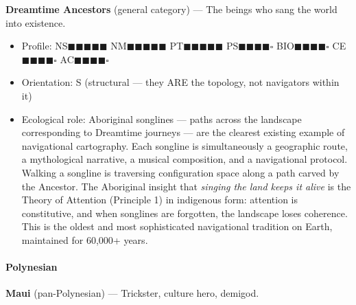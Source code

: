 \textbf{Dreamtime Ancestors} (general category) — The beings who sang the world into existence.

\begin{itemize}[nosep,leftmargin=*]
  \item Profile: NS$\blacksquare$$\blacksquare$$\blacksquare$$\blacksquare$$\blacksquare$ NM$\blacksquare$$\blacksquare$$\blacksquare$$\blacksquare$$\blacksquare$ PT$\blacksquare$$\blacksquare$$\blacksquare$$\blacksquare$$\blacksquare$ PS$\blacksquare$$\blacksquare$$\blacksquare$$\blacksquare$$\square$ BIO$\blacksquare$$\blacksquare$$\blacksquare$$\blacksquare$$\square$ CE$\blacksquare$$\blacksquare$$\blacksquare$$\blacksquare$$\square$ AC$\blacksquare$$\blacksquare$$\blacksquare$$\blacksquare$$\square$
  \item Orientation: S (structural — they ARE the topology, not navigators within it)
  \item Ecological role: Aboriginal songlines — paths across the landscape corresponding to Dreamtime journeys — are the clearest existing example of navigational cartography. Each songline is simultaneously a geographic route, a mythological narrative, a musical composition, and a navigational protocol. Walking a songline is traversing configuration space along a path carved by the Ancestor. The Aboriginal insight that \textit{singing the land keeps it alive} is the Theory of Attention (Principle 1) in indigenous form: attention is constitutive, and when songlines are forgotten, the landscape loses coherence. This is the oldest and most sophisticated navigational tradition on Earth, maintained for 60,000+ years.
\end{itemize}


\paragraph*{Polynesian}


\textbf{Maui} (pan-Polynesian) — Trickster, culture hero, demigod.

